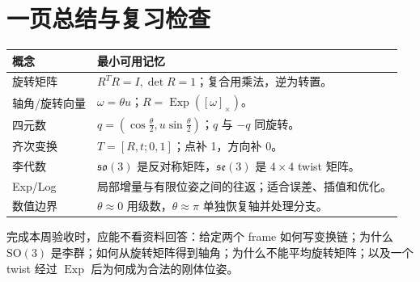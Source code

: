 \documentclass[UTF8,a4paper,11pt]{ctexart}
\newcommand{\SO}{\mathrm{SO}(3)}
\newcommand{\so}{\mathfrak{so}(3)}
\newcommand{\se}{\mathfrak{se}(3)}
\newcommand{\Exp}{\operatorname{Exp}}
\newcommand{\hatmat}[1]{\left[#1\right]_{\times}}
\begin{document}
\section{一页总结与复习检查}
\begin{longtable}{p{2.7cm}p{10.5cm}}
\toprule
概念 & 最小可用记忆\\
\midrule
旋转矩阵 & $R^TR=I,\det R=1$；复合用乘法，逆为转置。\\
轴角/旋转向量 & $\omega=\theta u$；$R=\Exp(\hatmat{\omega})$。\\
四元数 & $q=(\cos\frac\theta2,u\sin\frac\theta2)$；$q$ 与 $-q$ 同旋转。\\
齐次变换 & $T=[R,t;0,1]$；点补 1，方向补 0。\\
李代数 & $\so$ 是反对称矩阵，$\se$ 是 $4\times4$ twist 矩阵。\\
Exp/Log & 局部增量与有限位姿之间的往返；适合误差、插值和优化。\\
数值边界 & $\theta\approx0$ 用级数，$\theta\approx\pi$ 单独恢复轴并处理分支。\\
\bottomrule
\end{longtable}

完成本周验收时，应能不看资料回答：给定两个 frame 如何写变换链；为什么 $\SO$ 是李群；如何从旋转矩阵得到轴角；为什么不能平均旋转矩阵；以及一个 twist 经过 $\Exp$ 后为何成为合法的刚体位姿。
\end{document}
